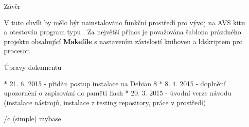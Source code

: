 \chap Závěr

V tuto chvíli by mělo být nainstalováno funkční prostředí pro vývoj na AVS kitu a otestován program typu . Za největší přínos je považována šablona prázdného projektu obsahující {\bf Makefile} s nastavením závislostí knihoven a ldskriptem pro procesor.


\sec Úpravy dokumentu

\begitems
* 21. 6. 2015 - přidán postup instalace na Debian 8
* 8. 4. 2015 - doplnění upozornění o zapisování do paměti flash
* 20. 3. 2015 - úvodní verze návodu (instalace nástrojů, instalace z testing repository, práce v prostředí)
\enditems


\bibchap
\usebib/c (simple) mybase

\bye

